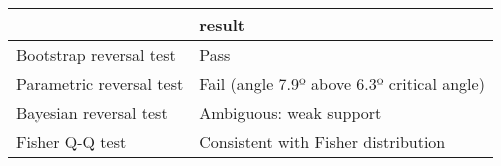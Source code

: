 \begin{tabular}{ll}
\toprule
{} &                                       result \\
\midrule
Bootstrap reversal test  &                                         Pass \\
Parametric reversal test &  Fail (angle 7.9º above 6.3º critical angle) \\
Bayesian reversal test   &                      Ambiguous: weak support \\
Fisher Q-Q test          &          Consistent with Fisher distribution \\
\bottomrule
\end{tabular}
